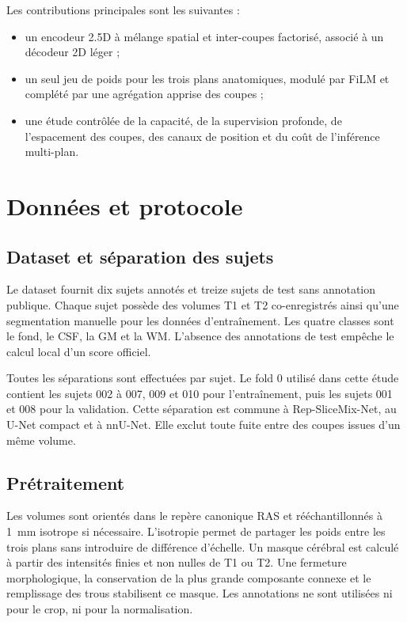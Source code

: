 \documentclass[11pt,a4paper]{article}
\begin{document}
Les contributions principales sont les suivantes :
\begin{itemize}
  \item un encodeur 2.5D à mélange spatial et inter-coupes factorisé, associé à
        un décodeur 2D léger ;
  \item un seul jeu de poids pour les trois plans anatomiques, modulé par FiLM
        et complété par une agrégation apprise des coupes ;
  \item une étude contrôlée de la capacité, de la supervision profonde, de
        l'espacement des coupes, des canaux de position et du coût de
        l'inférence multi-plan.
\end{itemize}

\section{Données et protocole}

\subsection{Dataset et séparation des sujets}

Le dataset fournit dix sujets annotés et treize sujets de test sans annotation
publique. Chaque sujet possède des volumes T1 et T2 co-enregistrés ainsi qu'une
segmentation manuelle pour les données d'entraînement. Les quatre classes sont
le fond, le CSF, la GM et la WM. L'absence des annotations de test empêche le
calcul local d'un score officiel.

Toutes les séparations sont effectuées par sujet. Le fold 0 utilisé dans cette
étude contient les sujets 002 à 007, 009 et 010 pour l'entraînement, puis les
sujets 001 et 008 pour la validation. Cette séparation est commune à
Rep-SliceMix-Net, au U-Net compact et à nnU-Net. Elle exclut toute fuite entre
des coupes issues d'un même volume.

\subsection{Prétraitement}

Les volumes sont orientés dans le repère canonique RAS et rééchantillonnés à
1~mm isotrope si nécessaire. L'isotropie permet de partager les poids entre les
trois plans sans introduire de différence d'échelle. Un masque cérébral est
calculé à partir des intensités finies et non nulles de T1 ou T2. Une fermeture
morphologique, la conservation de la plus grande composante connexe et le
remplissage des trous stabilisent ce masque. Les annotations ne sont utilisées
ni pour le crop, ni pour la normalisation.
\end{document}
